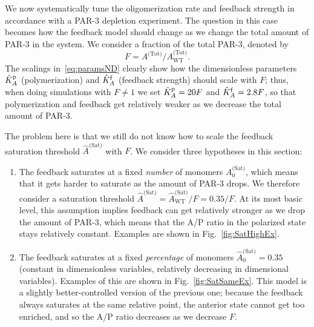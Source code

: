 \documentclass[11pt]{article}
\newcommand{\6}[1]{#1_{\text{6}}}
\newcommand{\3}[1]{#1_{\text{3}}}
\newcommand{\Tot}[1]{#1^\text{(Tot)}}
\newcommand{\Sat}[1]{#1^\text{(Sat)}}
\begin{document}
We now systematically tune the oligomerization rate and feedback strength in accordance with a PAR-3 depletion experiment. The question in this case becomes how the feedback model should change as we change the total amount of PAR-3 in the system. We consider a fraction of the total PAR-3, denoted by \begin{equation*}
F=\Tot{A}/\Tot{A}_\text{WT}.
\end{equation*}
The scalings in\ \eqref{eq:paramsND} clearly show how the dimensionless parameters $\hat{K}^\text{p}_A$ (polymerization) and $\hat{K}^\text{f}_A$ (feedback strength) should scale with $F$; thus, when doing simulations with $F \neq 1$ we set $\hat{K}^\text{p}_A=20F$ and $\hat{K}^\text{f}_A=2.8F$, so that polymerization and feedback get relatively weaker as we decrease the total amount of PAR-3. 

The problem here is that we still do not know how to scale the feedback saturation threshold $\Sat{\hat A}$ with $F$. We consider three hypotheses in this section:
\begin{enumerate}
\item The feedback saturates at a fixed \emph{number} of monomers $\Sat{A}_0$, which means that it gets harder to saturate as the amount of PAR-3 drops. We therefore consider a saturation threshold $\Sat{\hat A}=\Sat{\hat A}_\text{WT}/F=0.35/F$. At its most basic level, this assumption implies feedback can get relatively stronger as we drop the amount of PAR-3, which means that the A/P ratio in the polarized state stays relatively constant. Examples are shown in Fig.\ \ref{fig:SatHighEx}. 
\item The feedback saturates at a fixed \emph{percentage} of monomers $\Sat{\hat A}_0=0.35$ (constant in dimensionless variables, relatively decreasing in dimensional variables). Examples of this are shown in Fig.\ \ref{fig:SatSameEx}. This model is a slightly better-controlled version of the previous one; because the feedback always saturates at the same relative point, the anterior state cannot get too enriched, and so the A/P ratio decreases as we decrease $F$. 
\end{enumerate}
\end{document}
